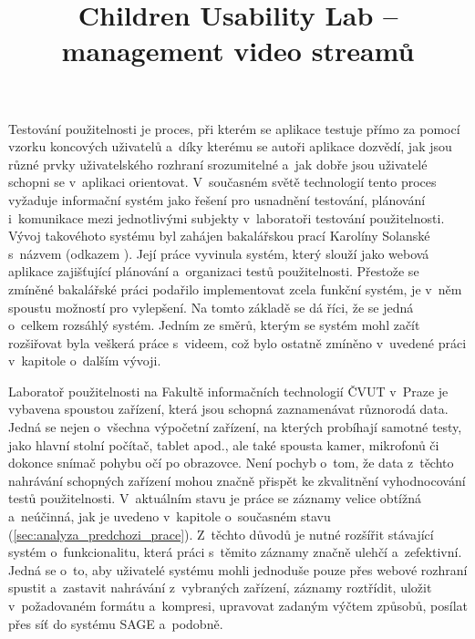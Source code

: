 \documentclass[thesis=M,czech]{FITthesis}[2012/06/26]
\title{Children Usability Lab -- management video streamů}
\begin{document}

\begin{introduction}
Testování použitelnosti je proces, při kterém se aplikace testuje přímo za pomocí vzorku koncových uživatelů a~díky kterému 
se autoři aplikace dozvědí, jak jsou různé prvky uživatelského rozhraní srozumitelné a~jak dobře jsou uživatelé schopni se v~aplikaci orientovat. V~současném světě technologií tento proces vyžaduje informační systém jako řešení pro usnadnění testování, plánování i~komunikace mezi jednotlivými subjekty v~laboratoři testování použitelnosti. Vývoj takovéhoto systému byl zahájen bakalářskou prací Karolíny Solanské s~názvem  (odkazem \cite{solankar}). Její práce vyvinula systém, který slouží jako webová aplikace zajišťující plánování a~organizaci testů použitelnosti. Přestože se zmíněné bakalářské práci podařilo implementovat zcela funkční systém, je v~něm spoustu možností pro vylepšení. Na tomto základě se dá říci, že se jedná o~celkem rozsáhlý systém. Jedním ze směrů, kterým se systém mohl začít rozšiřovat byla veškerá práce s~videem, což bylo ostatně zmíněno v~uvedené práci v~kapitole o~dalším vývoji.

Laboratoř použitelnosti na Fakultě informačních technologií ČVUT v~Praze je vybavena spoustou zařízení, která jsou schopná zaznamenávat různorodá data. Jedná se nejen o~všechna výpočetní zařízení, na kterých probíhají samotné testy, jako hlavní stolní počítač, tablet apod., ale také spousta kamer, mikrofonů či dokonce snímač pohybu očí po obrazovce. Není pochyb o~tom, že data z~těchto nahrávání schopných zařízení mohou značně přispět ke zkvalitnění vyhodnocování testů použitelnosti. V~aktuálním stavu je práce se záznamy velice obtížná a~neúčinná, jak je uvedeno v~kapitole o~současném stavu (\ref{sec:analyza_predchozi_prace}). Z~těchto důvodů je nutné rozšířit stávající systém o~funkcionalitu, která práci s~těmito záznamy značně ulehčí a~zefektivní. Jedná se o~to, aby uživatelé systému mohli jednoduše pouze přes webové rozhraní spustit a~zastavit nahrávání z~vybraných zařízení, záznamy roztřídit, uložit v~požadovaném formátu a~kompresi, upravovat zadaným výčtem způsobů, posílat přes síť do systému SAGE a~podobně.
\end{introduction}
\end{document}
